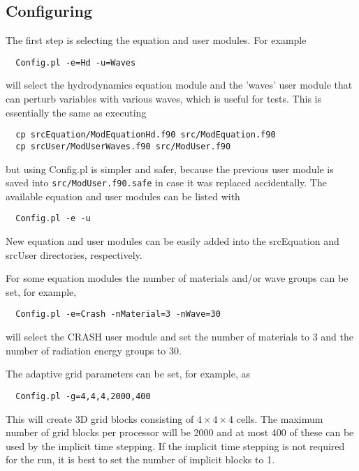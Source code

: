 
\subsection{Configuring \BATSRUS}

The first step is selecting the equation and user modules. For example 
\begin{verbatim}
  Config.pl -e=Hd -u=Waves
\end{verbatim}
will select the hydrodynamics equation module and the 'waves' user module
that can perturb variables with various waves, which is useful for tests.
This is essentially the same as executing
\begin{verbatim}
  cp srcEquation/ModEquationHd.f90 src/ModEquation.f90
  cp srcUser/ModUserWaves.f90 src/ModUser.f90
\end{verbatim}
but using Config.pl is simpler and safer, because the previous user module
is saved into {\tt src/ModUser.f90.safe} in case it was replaced accidentally.
The available equation and user modules can be listed with
\begin{verbatim}
  Config.pl -e -u
\end{verbatim}
New equation and user modules can be easily added into the srcEquation and srcUser
directories, respectively.

For some equation modules the number of materials and/or wave groups can be set, 
for example, 
\begin{verbatim}
  Config.pl -e=Crash -nMaterial=3 -nWave=30
\end{verbatim}
will select the CRASH user module and set the number of materials to 3 and the 
number of radiation energy groups to 30.

The adaptive grid parameters can be set, for example, as
\begin{verbatim}
  Config.pl -g=4,4,4,2000,400
\end{verbatim}
This will create 3D grid blocks consisting of $4\times 4\times 4$ cells.
The maximum number of grid blocks per processor will be 2000 and at most 
400 of these can be used by the implicit time stepping. If the implicit
time stepping is not required for the run, it is best to set the number
of implicit blocks to 1. 

